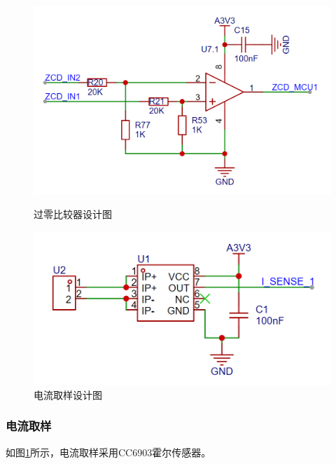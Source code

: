 \documentclass[a4paper,12pt]{article}
\begin{document}
\begin{figure}[htbp]
    \centering
    \begin{minipage}{0.45\textwidth}
        \centering
        \includegraphics[width=1\textwidth]{src/fig8.png}
        \caption{过零比较器设计图}
        \label{fig8}
    \end{minipage}
    \quad
    \begin{minipage}{0.45\textwidth}
        \centering
        \includegraphics[width=1\textwidth]{src/fig11.png}
        \caption{电流取样设计图}
        \label{fig11}
    \end{minipage}
\end{figure}
\subsubsection{电流取样}
如图\ref{fig11}所示，电流取样采用CC6903霍尔传感器。
\end{document}
